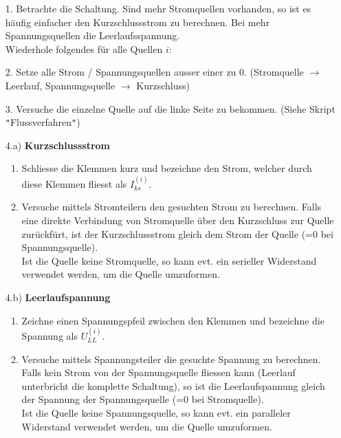 																				\newpage
																				\beginvor
																				\begin{itemize}

																				  \item[1.] Betrachte die Schaltung. Sind mehr Stromquellen vorhanden, so ist es häufig einfacher den Kurzschlussstrom zu berechnen. Bei mehr Spannungsquellen die Leerlaufsspannung. \\
																				  Wiederhole folgendes für alle Quellen $i$: \\
																				  \end{itemize}
																				  \beginip
																				  \begin{itemize}

																				  \item [2.  ]  Setze alle Strom / Spannungsquellen ausser einer zu 0. (Stromquelle $\rightarrow$ Leerlauf, Spannungsquelle $\rightarrow$ Kurzschluss)
																				  \item[3. ] Versuche die einzelne Quelle auf die linke Seite zu bekommen. (Siehe Skript \texttt{"}Flussverfahren\texttt{"})
																				  \item[4.a)] \textbf{Kurzschlussstrom}
																				  \begin{enumerate}
																				  \item Schliesse die Klemmen kurz und bezeichne den Strom, welcher durch diese Klemmen fliesst als $I_{ks}^{(i)}$.
																				  \item Versuche mittels Stromteilern den gesuchten Strom zu berechnen. Falls eine direkte Verbindung von Stromquelle über den Kurzschluss zur Quelle zurückfürt, ist der Kurzschlussstrom gleich dem Strom der Quelle (=0 bei Spannungsquelle). \\
																				  Ist die Quelle keine Stromquelle, so kann evt. ein serieller Widerstand verwendet werden, um die Quelle umzuformen.
																				  \end{enumerate}
																				  \item[4.b)] \textbf{Leerlaufspannung}
																				  \begin{enumerate}
																				  \item Zeichne einen Spannungspfeil zwischen den Klemmen und bezeichne die Spannung als $U_{LL}^{(i)}$.
																				  \item Versuche mittels Spannungsteiler die gesuchte Spannung zu berechnen. Falls kein Strom von der Spannungsquelle fliessen kann (Leerlauf unterbricht die komplette Schaltung), so ist die Leerlaufspannung gleich der Spannung der Spannungsquelle (=0 bei Stromquelle). \\
																				  Ist die Quelle keine Spannungsquelle, so kann evt. ein paralleler Widerstand verwendet werden, um die Quelle umzuformen.
																				  \end{enumerate}
																				\end{itemize}

